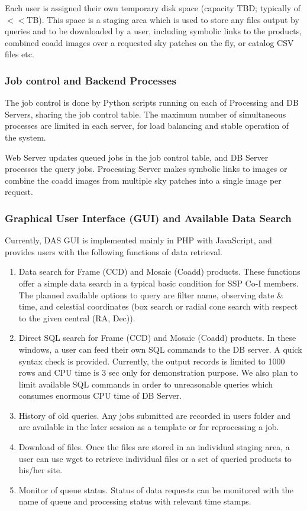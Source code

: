 \documentclass[12pt]{article}
\begin{document}
Each user is assigned their own temporary disk space (capacity
TBD; typically of $<<$TB). This space is a staging area which is used to store any files
output by queries and to be downloaded by a user, including 
symbolic links to the products, combined coadd images over a requested
sky patches on the fly, or catalog CSV files etc.

\subsubsection{Job control and Backend Processes}
The job control is done by Python scripts running on each of Processing
and DB Servers, sharing the job control table. 
The maximum number of simultaneous processes are limited in each server,
for load balancing and stable operation of the system.

Web Server updates queued jobs in the job control table, and DB Server
processes the query jobs. Processing Server makes symbolic links to
images or combine the coadd images from multiple sky patches into a
single image per request. 

\subsubsection{Graphical User Interface (GUI) and Available Data Search}
Currently, DAS GUI is implemented mainly in PHP with JavaScript, and
provides users with the following functions of data retrieval.

\begin{enumerate}
\item Data search for Frame (CCD) and Mosaic (Coadd) products. These 
     functions offer a simple data search in a typical basic condition
     for SSP Co-I members.  The planned available options to query are filter
     name, observing date \& time, and celestial coordinates (box
     search or radial cone search with respect to the given central (RA, Dec)). 
\item Direct SQL search for Frame (CCD) and Mosaic (Coadd) products. 
     In these windows, a user can feed their own SQL commands to the DB
     server. 
     A quick syntax check is provided. 
    Currently, the output records is  limited to 1000 rows and CPU time
     is 3 sec only for demonstration purpose.
   We also plan to limit available SQL commands in order to unreasonable
    queries which consumes enormous CPU time of DB Server.
\item History of old queries. Any jobs submitted are recorded in users
     folder and are available in the later session as a template or
     for reprocessing a job.
\item Download of files. Once the files are stored in an individual
     staging area, a user can use wget to retrieve individual files or
     a set of queried products to his/her site.
\item Monitor of queue status. Status of data requests can be monitored
     with the name of queue and processing status with relevant time stamps.
\end{enumerate}
\end{document}
